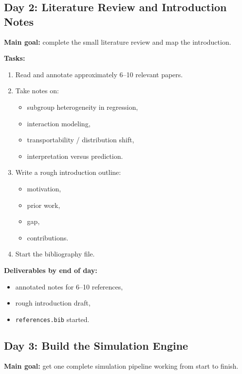 \documentclass[11pt]{article}
\begin{document}
\subsection*{Day 2: Literature Review and Introduction Notes}
\textbf{Main goal:} complete the small literature review and map the introduction.

\textbf{Tasks:}
\begin{enumerate}[label=(\arabic*)]
    \item Read and annotate approximately 6--10 relevant papers.
    \item Take notes on:
    \begin{itemize}
        \item subgroup heterogeneity in regression,
        \item interaction modeling,
        \item transportability / distribution shift,
        \item interpretation versus prediction.
    \end{itemize}
    \item Write a rough introduction outline:
    \begin{itemize}
        \item motivation,
        \item prior work,
        \item gap,
        \item contributions.
    \end{itemize}
    \item Start the bibliography file.
\end{enumerate}

\textbf{Deliverables by end of day:}
\begin{itemize}
    \item annotated notes for 6--10 references,
    \item rough introduction draft,
    \item \texttt{references.bib} started.
\end{itemize}

\subsection*{Day 3: Build the Simulation Engine}
\textbf{Main goal:} get one complete simulation pipeline working from start to finish.
\end{document}
